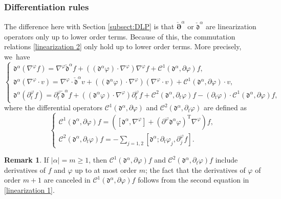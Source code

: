 \documentclass[10pt]{amsart}
\newcommand{\dt}{\partial_t}
\newcommand{\cpalpha}{\check{\bm{\partial}}^{\alpha} }
\newcommand{\cmfalpha}{\check{\mathfrak{d}}^{\alpha}}
\theoremstyle{definition}
\newtheorem{remark}[theorem]{Remark}
\begin{document}
\subsubsection{Differentiation rules} \label{sectdiffrules}
The difference here with Section \ref{subsect:DLP} is that $\cpalpha$ or $\cmfalpha$ are linearization operators only up to lower order terms.
Because of this, the commutation relations \eqref{linearization 2} only hold up to lower order terms. More precisely, we~have
\begin{equation}\label{comrules2}
\begin{cases}
\mathfrak{d}^\alpha(\nabla^\varphi f)
= \nabla^\varphi \cmfalpha f \!+\! ((\mathfrak{d}^\alpha\varphi)\cdot\nabla^\varphi)\nabla^\varphi f \!+\!{\mathcal C}^1(\mathfrak{d}^\alpha,\partial \varphi) f, \\
\mathfrak{d}^\alpha(\nabla^\varphi\cdot v)
= \nabla^\varphi\cdot \cmfalpha v
\!+\! ((\mathfrak{d}^\alpha\varphi)\cdot\nabla^\varphi)(\nabla^\varphi\cdot v) \!+\!{\mathcal C}^1(\mathfrak{d}^\alpha,\partial \varphi)\cdot v, \\
\mathfrak{d}^\alpha(\dt^\varphi f)
= \dt^\varphi \cmfalpha f\!+\! ((\mathfrak{d}^\alpha\varphi)\cdot\nabla^\varphi)\dt^\varphi f \!+\!
{\mathcal C}^2(\mathfrak{d}^\alpha,\dt \varphi) f
- (\dt\varphi)\cdot {\mathcal C}^1(\mathfrak{d}^\alpha,\partial \varphi)f,
\end{cases}
\end{equation}
where the differential operators ${\mathcal C}^1(\mathfrak{d}^\alpha,\partial \varphi)$ and ${\mathcal C}^2(\mathfrak{d}^\alpha,\dt \varphi)$ are defined as
\begin{equation}\label{defcomC}
\begin{cases}
{\mathcal C}^1(\mathfrak{d}^\alpha,\partial \varphi) f
= ([\mathfrak{d}^\alpha,\nabla^\varphi]+(\partial^\varphi\mathfrak{d}^\alpha\varphi)^\mathrm{T}\nabla^\varphi)f, \\
{\mathcal C}^2(\mathfrak{d}^\alpha,\dt \varphi) f
= - \textstyle\sum_{j=1,2}[\mathfrak{d}^\alpha; \dt\varphi_j,\partial_j^\varphi f].
\end{cases}
\end{equation}

\begin{remark}\label{remC1C2}
If $|\alpha|=m\geq1$, then ${\mathcal C}^1(\mathfrak{d}^\alpha,\partial \varphi) f$
and ${\mathcal C}^2(\mathfrak{d}^\alpha,\dt \varphi) f$ include derivatives of $f$ and $\varphi$ up to at most order $m$;
the fact that the derivatives of $\varphi$ of order $m+1$ are canceled in ${\mathcal C}^1(\mathfrak{d}^\alpha,\partial \varphi) f$
follows from the second equation in \eqref{linearization 1}.
\end{remark}
\end{document}
